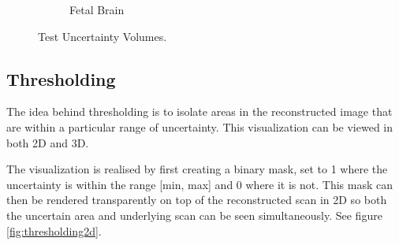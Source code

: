 \begin{figure}[h]
\begin{subfigure}[b]{0.18\textwidth}
    \caption{Fetal Brain}
    \label{fig:test_example}
  \end{subfigure}
  \caption{Test Uncertainty Volumes.}\label{fig:test_uncertainties}
\end{figure}


\clearpage
\subsection{Thresholding}\label{method:thresholding}
The idea behind thresholding is to isolate areas in the reconstructed image that are within a particular range of uncertainty. This visualization can be viewed in both 2D and 3D.

The visualization is realised by first creating a binary mask, set to 1 where the uncertainty is within the range [min, max] and 0 where it is not. This mask can then be rendered transparently on top of the reconstructed scan in 2D so both the uncertain area and underlying scan can be seen simultaneously. See figure \ref{fig:thresholding2d}.

